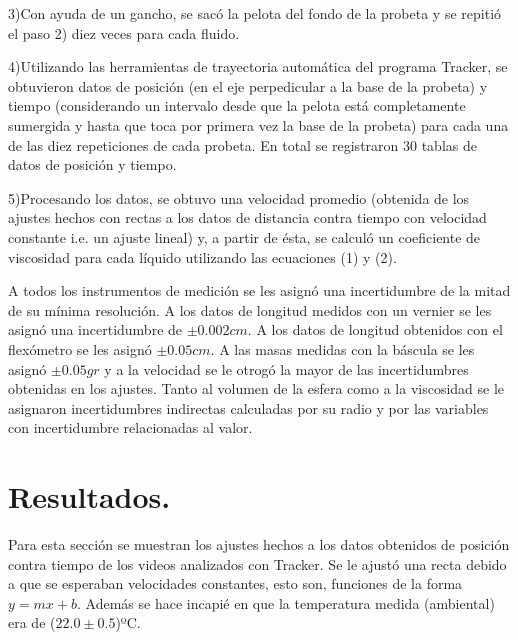 \documentclass[a4paper]{article}
\begin{document}
3)Con ayuda de un gancho, se sacó la pelota del fondo de la probeta y se repitió el paso 2) diez veces para cada fluido. 

4)Utilizando las herramientas de trayectoria automática del programa Tracker, se obtuvieron datos de posición (en el eje perpedicular a la base de la probeta) y tiempo (considerando un intervalo desde que la pelota está completamente sumergida y hasta que toca por primera vez la base de la probeta) para cada una de las diez repeticiones de cada probeta. En total se registraron 30 tablas de datos de posición y tiempo.

5)Procesando los datos, se obtuvo una velocidad promedio (obtenida de los ajustes hechos con rectas a los datos de distancia contra tiempo con velocidad constante i.e. un ajuste lineal) y, a partir de ésta, se calculó un coeficiente de viscosidad para cada líquido utilizando las ecuaciones (1) y (2).

A todos los instrumentos de medición se les asignó una incertidumbre de la mitad de su mínima resolución. A los datos de longitud medidos con un vernier se les asignó una incertidumbre de $\pm0.002cm$. A los datos de longitud obtenidos con el flexómetro se les asignó $\pm0.05 cm$. A las masas medidas con la báscula se les asignó $\pm 0.05gr$ y a la velocidad se le otrogó la mayor de las incertidumbres obtenidas en los ajustes. Tanto al volumen de la esfera como a la viscosidad se le asignaron incertidumbres indirectas calculadas por su radio y por las variables con incertidumbre relacionadas al valor.



\section*{Resultados.}
Para esta sección se muestran los ajustes hechos a los datos obtenidos de posición contra tiempo de los videos analizados con Tracker. Se le ajustó una recta debido a que se esperaban velocidades constantes, esto son, funciones de la forma $y = mx+b$. Además se hace incapié en que la temperatura medida (ambiental) era de ($22.0\pm0.5$)ºC.
\end{document}
